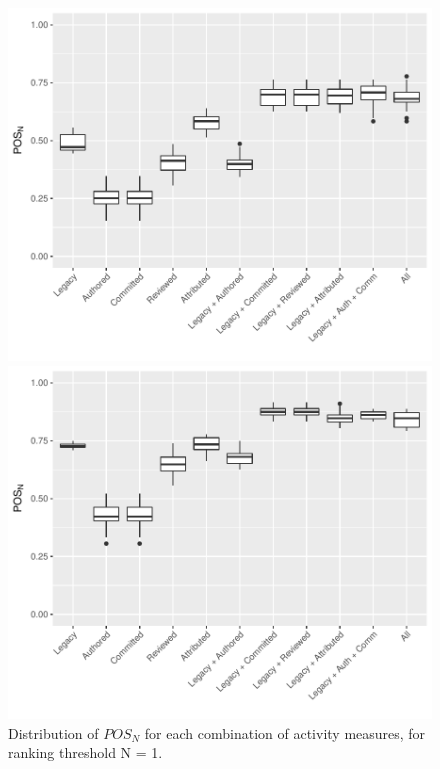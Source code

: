  



\begin{figure}[t]
  \centering
  \begin{minipage}[b]{\columnwidth}
    \centering
    \includegraphics[scale=.5]{plots/RQ2_metrics_N1_one_maint}
    \caption{Distribution of $POS_N$ for each combination of activity measures, for ranking threshold N = 1. }
    \label{fig:rq2_1}
  \end{minipage}
  \begin{minipage}[b]{\columnwidth}
    \centering
    \includegraphics[scale=.5]{plots/RQ2_metrics_N3_one_maint}

\end{minipage}
\end{figure}
